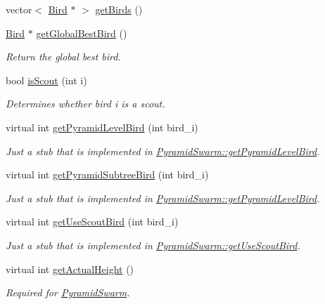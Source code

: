 \begin{CompactItemize}
vector$<$ \hyperlink{classBird}{Bird} $\ast$ $>$ \hyperlink{classSwarm_3459aae3e91fa3330ea467deccee3c13}{getBirds} ()
\item 
\hyperlink{classBird}{Bird} $\ast$ \hyperlink{classSwarm_7636f17fe7017c9665678e85e20b9779}{getGlobalBestBird} ()
\begin{CompactList}\small\item\em Return the global best bird. \item\end{CompactList}\item 
bool \hyperlink{classSwarm_a94833190b28c495684e9681ee91b3b8}{isScout} (int i)
\begin{CompactList}\small\item\em Determines whether bird i is a scout. \item\end{CompactList}\item 
virtual int \hyperlink{classSwarm_98b6b325d8caffbc62010f80a229ad6c}{getPyramidLevelBird} (int bird\_\-i)
\begin{CompactList}\small\item\em Just a stub that is implemented in \hyperlink{classPyramidSwarm_756af67d13a153ab3d2581673733b474}{PyramidSwarm::getPyramidLevelBird}. \item\end{CompactList}\item 
virtual int \hyperlink{classSwarm_c2cd792ce6be2f833f9a37377e1e0885}{getPyramidSubtreeBird} (int bird\_\-i)
\begin{CompactList}\small\item\em Just a stub that is implemented in \hyperlink{classPyramidSwarm_756af67d13a153ab3d2581673733b474}{PyramidSwarm::getPyramidLevelBird}. \item\end{CompactList}\item 
virtual int \hyperlink{classSwarm_dc807f39f42c11f5ba10c0a82f1e6f4e}{getUseScoutBird} (int bird\_\-i)
\begin{CompactList}\small\item\em Just a stub that is implemented in \hyperlink{classSwarm_dc807f39f42c11f5ba10c0a82f1e6f4e}{PyramidSwarm::getUseScoutBird}. \item\end{CompactList}\item 
virtual int \hyperlink{classSwarm_73a690fe6e3d6550098dc8ffc2f977c2}{getActualHeight} ()
\begin{CompactList}\small\item\em Required for \hyperlink{classPyramidSwarm}{PyramidSwarm}. \item\end{CompactList}\item 

\end{CompactItemize}
